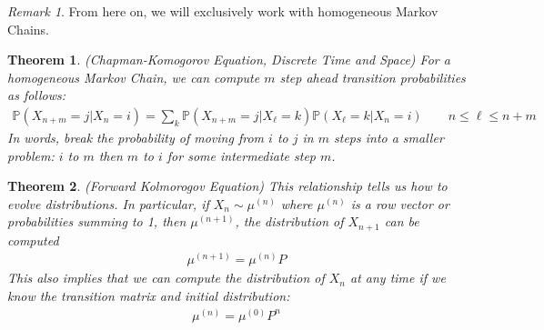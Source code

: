 \documentclass[12pt]{article}
\theoremstyle{plain}
\newtheorem{thm}{Theorem}[section]
\theoremstyle{definition}
\theoremstyle{remark}
\newtheorem*{rmk}{Remark}
\begin{document}
\begin{rmk}
From here on, we will exclusively work with homogeneous Markov Chains.
\end{rmk}

\begin{thm}{\emph{(Chapman-Komogorov Equation, Discrete Time and Space)}}
For a homogeneous Markov Chain, we can compute $m$ step ahead transition
probabilities as follows:
\begin{align*}
  \mathbb{P}(X_{n+m}=j | X_{n}=i) = \sum_k \mathbb{P}(X_{n+m}=j| X_\ell=k)
    \mathbb{P}(X_\ell = k| X_n=i)
  \qquad
  n \leq \ell \leq n+m
\end{align*}
In words, break the probability of moving from $i$ to $j$ in $m$ steps
into a smaller problem: $i$ to $m$ then $m$ to $i$ for some intermediate
step $m$.
\end{thm}

\begin{thm}{\emph{(Forward Kolmorogov Equation)}}
This relationship tells us how to evolve distributions. In particular,
if $X_n\sim \mu^{(n)}$ where $\mu^{(n)}$ is a row vector or
probabilities summing to 1, then $\mu^{(n+1)}$, the distribution of
$X_{n+1}$ can be computed
\begin{align*}
  \mu^{(n+1)} = \mu^{(n)} P
\end{align*}
This also implies that we can compute the distribution of $X_n$ at any
time if we know the transition matrix and initial distribution:
\begin{align*}
  \mu^{(n)} = \mu^{(0)} P^n
\end{align*}
\end{thm}
\end{document}
